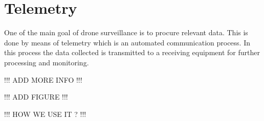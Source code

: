 \section{Telemetry}\label{sec:telemetry}
One of the main goal of drone surveillance is to procure relevant data. This is done by means of telemetry which is an automated communication process. In this process the data collected is transmitted to a receiving equipment for further processing and monitoring. 

!!! ADD MORE INFO !!!

!!! ADD FIGURE !!!

!!! HOW WE USE IT ? !!!